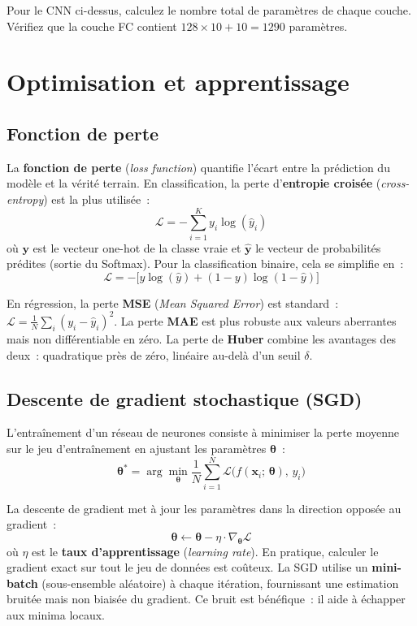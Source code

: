 \documentclass[a4paper,11pt,twoside]{book}
\newcommand{\vect}[1]{\boldsymbol{#1}}
\begin{document}
\begin{exobox}[Exercice]
Pour le CNN ci-dessus, calculez le nombre total de paramètres de chaque couche. Vérifiez que la couche FC contient $128 \times 10 + 10 = 1290$ paramètres.
\end{exobox}


\chapter{Optimisation et apprentissage}

\section{Fonction de perte}

La \textbf{fonction de perte} (\textit{loss function}) quantifie l'écart entre la prédiction du modèle et la vérité terrain. En classification, la perte d'\textbf{entropie croisée} (\textit{cross-entropy}) est la plus utilisée~:
\[
\mathcal{L} = -\sum_{i=1}^{K} y_i \log(\hat{y}_i)
\]
où $\vect{y}$ est le vecteur one-hot de la classe vraie et $\hat{\vect{y}}$ le vecteur de probabilités prédites (sortie du Softmax). Pour la classification binaire, cela se simplifie en~:
\[
\mathcal{L} = -\big[y \log(\hat{y}) + (1-y) \log(1-\hat{y})\big]
\]

En régression, la perte \textbf{MSE} (\textit{Mean Squared Error}) est standard~: $\mathcal{L} = \frac{1}{N}\sum_i (y_i - \hat{y}_i)^2$. La perte \textbf{MAE} est plus robuste aux valeurs aberrantes mais non différentiable en zéro. La perte de \textbf{Huber} combine les avantages des deux~: quadratique près de zéro, linéaire au-delà d'un seuil $\delta$.

\section{Descente de gradient stochastique (SGD)}

L'entraînement d'un réseau de neurones consiste à minimiser la perte moyenne sur le jeu d'entraînement en ajustant les paramètres $\vect{\theta}$~:
\[
\vect{\theta}^* = \arg\min_{\vect{\theta}} \frac{1}{N} \sum_{i=1}^{N} \mathcal{L}\big(f(\vect{x}_i;\, \vect{\theta}),\, y_i\big)
\]

La descente de gradient met à jour les paramètres dans la direction opposée au gradient~:
\[
\vect{\theta} \leftarrow \vect{\theta} - \eta \cdot \nabla_{\vect{\theta}} \mathcal{L}
\]
où $\eta$ est le \textbf{taux d'apprentissage} (\textit{learning rate}). En pratique, calculer le gradient exact sur tout le jeu de données est coûteux. La SGD utilise un \textbf{mini-batch} (sous-ensemble aléatoire) à chaque itération, fournissant une estimation bruitée mais non biaisée du gradient. Ce bruit est bénéfique~: il aide à échapper aux minima locaux.
\end{document}
